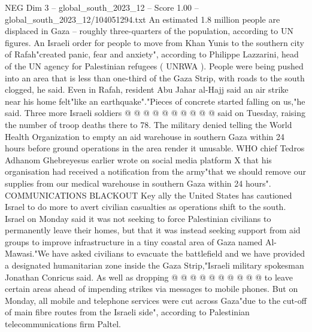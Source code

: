 \begin{textsample}{NEG Dim 3 – global\_south\_2023\_12 – Score 1.00 – global\_south\_2023\_12/104051294.txt}
An estimated 1.8 million people are displaced in Gaza -- roughly three-quarters of the population, according to UN figures.
An Israeli order for people to move from Khan Yunis to the southern city of Rafah"created panic, fear and anxiety", according to Philippe Lazzarini, head of the UN agency for Palestinian refugees ( UNRWA ).
People were being pushed into an area that is less than one-third of the Gaza Strip, with roads to the south clogged, he said.
Even in Rafah, resident Abu Jahar al-Hajj said an air strike near his home felt"like an earthquake"."Pieces of concrete started falling on us,"he said.
Three more Israeli soldiers @ @ @ @ @ @ @ @ @ @ said on Tuesday, raising the number of troop deaths there to 78.
The military denied telling the World Health Organization to empty an aid warehouse in southern Gaza within 24 hours before ground operations in the area render it unusable.
WHO chief Tedros Adhanom Ghebreyesus earlier wrote on social media platform X that his organisation had received a notification from the army"that we should remove our supplies from our medical warehouse in southern Gaza within 24 hours".
COMMUNICATIONS BLACKOUT Key ally the United States has cautioned Israel to do more to avert civilian casualties as operations shift to the south.
Israel on Monday said it was not seeking to force Palestinian civilians to permanently leave their homes, but that it was instead seeking support from aid groups to improve infrastructure in a tiny coastal area of Gaza named Al-Mawasi."We have asked civilians to evacuate the battlefield and we have provided a designated humanitarian zone inside the Gaza Strip,"Israeli military spokesman Jonathan Conricus said.
As well as dropping @ @ @ @ @ @ @ @ @ @ to leave certain areas ahead of impending strikes via messages to mobile phones.
But on Monday, all mobile and telephone services were cut across Gaza"due to the cut-off of main fibre routes from the Israeli side", according to Palestinian telecommunications firm Paltel.

\end{textsample}

